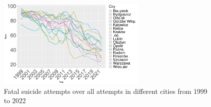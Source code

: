 \documentclass{article}
\begin{document}
\begin{figure}[H]
	\centering
		\includegraphics[width=0.65\textwidth]{imgs/city_foa.pdf}
		\caption{Fatal suicide attempts over all attempts in different cities from 1999 to 2022}
		\label{fig:city_foa}
\end{figure}
\end{document}
